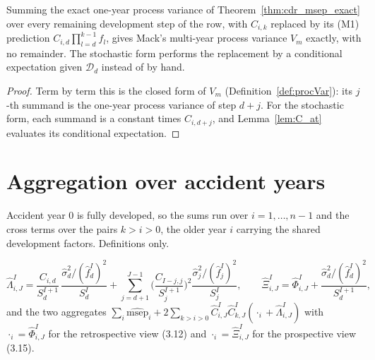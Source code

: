 \begin{theorem}\label{thm:cdr_telescope}\leanok
{}
Summing the exact one-year process variance of Theorem~\ref{thm:cdr_msep_exact} over every
remaining development step of the row, with $C_{i,k}$ replaced by its (M1) prediction
$C_{i,d}\prod_{l=d}^{k-1} f_l$, gives Mack's multi-year process variance $V_m$ exactly, with no
remainder. The stochastic form performs the replacement by a conditional expectation given
$\mathcal{D}_d$ instead of by hand.
\end{theorem}
\begin{proof}\leanok
Term by term this is the closed form of $V_m$ (Definition~\ref{def:procVar}): its $j$-th summand is
the one-year process variance of step $d+j$. For the stochastic form, each summand is a constant
times $C_{i,d+j}$, and Lemma~\ref{lem:C_at} evaluates its conditional expectation.
\end{proof}

\section{Aggregation over accident years}

Accident year $0$ is fully developed, so the sums run over $i = 1, \dots, n-1$ and the cross terms
over the pairs $k > i > 0$, the older year $i$ carrying the shared development factors.
Definitions only.

\begin{definition}[Displays (3.12)-(3.15)]\label{def:mw_total}\leanok
{}
\[
 \hat\Lambda^I_{i,J} = \frac{C_{i,d}}{S^{I+1}_{d}}\,\frac{\hat\sigma^2_{d}/(\hat f^I_{d})^2}{S^I_{d}}
  + \sum_{j=d+1}^{J-1}\Big(\frac{C_{I-j,j}}{S^{I+1}_j}\Big)^2\frac{\hat\sigma^2_j/(\hat f^I_j)^2}{S^I_j},
 \qquad
 \hat\Xi^I_{i,J} = \hat\Phi^I_{i,J} + \frac{\hat\sigma^2_{d}/(\hat f^I_{d})^2}{S^{I+1}_{d}},
\]
and the two aggregates
$\sum_i \widehat{\mathrm{msep}}_i + 2\sum_{k>i>0}\hat C^I_{i,J}\hat C^I_{k,J}(\cdot_i + \hat\Lambda^I_{i,J})$
with $\cdot_i = \hat\Phi^I_{i,J}$ for the retrospective view (3.12) and $\cdot_i = \hat\Xi^I_{i,J}$
for the prospective view (3.15).
\end{definition}


